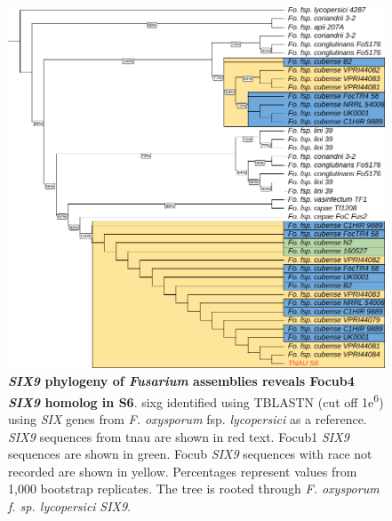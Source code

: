 \begin{figure}[htp!]
  \centering
  \includegraphics[]{Figures/FusSIX9-trimmed.phylo.pdf}
  \caption[\textit{SIX9} phylogeny of \textit{Fusarium} assemblies]{\textbf{\textit{SIX9} phylogeny of \textit{Fusarium} assemblies reveals \acl{Focub4} \textit{SIX9} homolog in S6}. \acl{sixg} identified using TBLASTN (cut off 1\-e\textsuperscript{6}) using \textit{SIX} genes from \textit{F. oxysporum} fsp. \textit{lycopersici} as a reference. \textit{SIX9} sequences from \ac{tnau} are shown in red text. \Acl{Focub1} \textit{SIX9} sequences are shown in green. \acl{Focub} \textit{SIX9} sequences with race not recorded are shown in yellow. Percentages represent values from 1,000 bootstrap replicates. The tree is rooted through \textit{F. oxysporum f. sp. lycopersici} \textit{SIX9}.}
  \label{fig:FusSIX9}
\end{figure}

